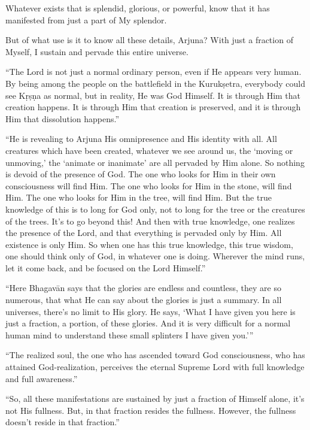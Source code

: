 {Whatever exists that is splendid, glorious, or powerful, know that it has manifested from just a part of My splendor.}

{But of what use is it to know all these details, Arjuna? With just a fraction of Myself, I sustain and pervade this entire universe.}

\enquote{The Lord is not just a normal ordinary person, even if He appears very human. By being among the people on the battlefield in the Kurukṣetra, everybody could see Kṛṣṇa as normal, but in reality, He was God Himself. It is through Him that creation happens. It is through Him that creation is preserved, and it is through Him that dissolution happens.}

\enquote{He is revealing to Arjuna His omnipresence and His identity with all. All creatures which have been created, whatever we see around us, the \enquote{moving or unmoving,} the \enquote{animate or inanimate} are all pervaded by Him alone. So nothing is devoid of the presence of God. The one who looks for Him in their own consciousness will find Him. The one who looks for Him in the stone, will find Him. The one who looks for Him in the tree, will find Him. But the true knowledge of this is to long for God only, not to long for the tree or the creatures of the trees. It’s to go beyond this! And then with true knowledge, one realizes the presence of the Lord, and that everything is pervaded only by Him. All existence is only Him. So when one has this true knowledge, this true wisdom, one should think only of God, in whatever one is doing. Wherever the mind runs, let it come back, and be focused on the Lord Himself.}

\enquote{Here Bhagavān says that the glories are endless and countless, they are so numerous, that what He can say about the glories is just a summary. In all universes, there’s no limit to His glory. He says, \enquote{What I have given you here is just a fraction, a portion, of these glories. And it is very difficult for a normal human mind to understand these small splinters I have given you.}}

\enquote{The realized soul, the one who has ascended toward God consciousness, who has attained God-realization, perceives the eternal Supreme Lord with full knowledge and full awareness.}

\enquote{So, all these manifestations are sustained by just a fraction of Himself alone, it’s not His fullness. But, in that fraction resides the fullness. However, the fullness doesn’t reside in that fraction.}

